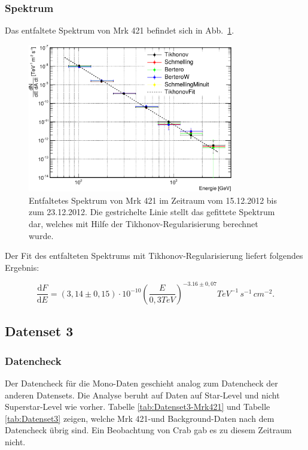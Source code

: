 \subsubsection{Spektrum}
Das entfaltete Spektrum von Mrk 421 befindet sich in Abb.~\ref{Datenset4_Spektrum_Mrk421}.

\begin{figure}
    \centering
    \includegraphics[width=0.8\textwidth]{./Plots/04_MrkAnalyse/Datenset4/Datenset4_Spektrum_Mrk421.pdf}
    \caption{Entfaltetes Spektrum von Mrk 421 im Zeitraum vom 15.12.2012 bis zum 23.12.2012.
    Die gestrichelte Linie stellt das gefittete Spektrum dar, welches mit Hilfe der Tikhonov-Regularisierung berechnet wurde.}
    \label{Datenset4_Spektrum_Mrk421}
\end{figure}

Der Fit des entfalteten Spektrums mit Tikhonov-Regularisierung liefert folgendes Ergebnis:

\begin{equation}
 \frac{\mathrm{d}F}{\mathrm{d}E}=(3,14 \pm 0,15) \cdot 10^{-10}\left( \frac{E}{0,3 \si{TeV}} \right)^{-3.16\pm 0,07} \si{TeV^{-1}\,s^{-1}\,cm^{-2}}.
\end{equation}


\FloatBarrier

\subsection{Datenset 3}
\label{subsec:Datenset_3}

\subsubsection{Datencheck}
Der Datencheck für die Mono-Daten geschieht analog zum Datencheck der anderen Datensets.
Die Analyse beruht auf Daten auf Star-Level und nicht Superstar-Level wie vorher.
Tabelle \ref{tab:Datenset3-Mrk421} und Tabelle \ref{tab:Datenset3} zeigen, welche Mrk 421-und Background-Daten nach dem Datencheck übrig sind.
Ein Beobachtung von Crab gab es zu diesem Zeitraum nicht.

